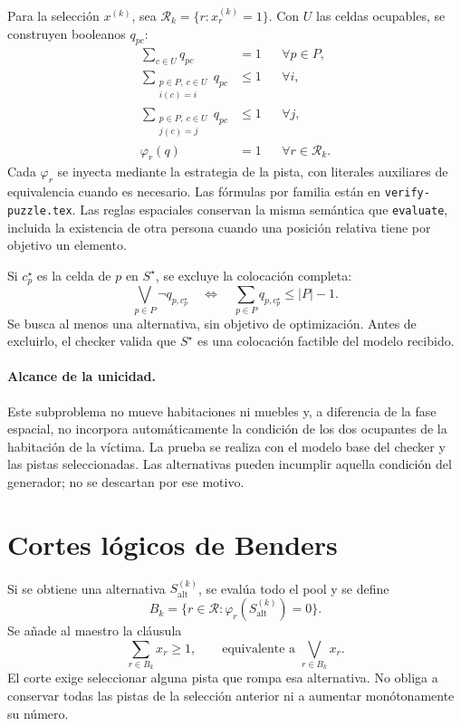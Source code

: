 \documentclass[11pt,a4paper]{article}
\begin{document}
Para la selecci\'on $x^{(k)}$, sea
$\mathcal R_k=\{r:x_r^{(k)}=1\}$.
Con $U$ las celdas ocupables, se construyen booleanos $q_{pc}$:
\begin{align}
 \sum_{c\in U}q_{pc}&=1 &&\forall p\in P,\\
 \sum_{\substack{p\in P,\ c\in U\\i(c)=i}}q_{pc}&\leq1
      &&\forall i,\\
 \sum_{\substack{p\in P,\ c\in U\\j(c)=j}}q_{pc}&\leq1
      &&\forall j,\\
 \varphi_r(q)&=1 &&\forall r\in\mathcal R_k.
\end{align}
Cada $\varphi_r$ se inyecta mediante la estrategia de la pista, con
literales auxiliares de equivalencia cuando es necesario.
Las f\'ormulas por familia est\'an en \texttt{verify-puzzle.tex}.
Las reglas espaciales conservan la misma sem\'antica que
\texttt{evaluate}, incluida la existencia de otra persona cuando
una posici\'on relativa tiene por objetivo un elemento.

Si $c_p^\star$ es la celda de $p$ en $S^\star$, se excluye la
colocaci\'on completa:
\[
 \bigvee_{p\in P}\neg q_{p,c_p^\star}
 \quad\Longleftrightarrow\quad
 \sum_{p\in P}q_{p,c_p^\star}\leq |P|-1.
\]
Se busca al menos una alternativa, sin objetivo de optimizaci\'on.
Antes de excluirlo, el checker valida que $S^\star$ es una
colocaci\'on factible del modelo recibido.

\paragraph{Alcance de la unicidad.}
Este subproblema no mueve habitaciones ni muebles y, a diferencia de
la fase espacial, no incorpora autom\'aticamente la condici\'on de
los dos ocupantes de la habitaci\'on de la v\'ictima. La prueba se
realiza con el modelo base del checker y las pistas seleccionadas.
Las alternativas pueden incumplir aquella condici\'on del generador;
no se descartan por ese motivo.

\section{Cortes l\'ogicos de Benders}

Si se obtiene una alternativa $S_{\mathrm{alt}}^{(k)}$, se eval\'ua
todo el pool y se define
\[
 B_k=\{r\in\mathcal R:\varphi_r(S_{\mathrm{alt}}^{(k)})=0\}.
\]
Se a\~nade al maestro la cl\'ausula
\[
 \boxed{\sum_{r\in B_k}x_r\geq1,}
 \qquad\text{equivalente a }\bigvee_{r\in B_k}x_r.
\]
El corte exige seleccionar alguna pista que rompa esa alternativa.
No obliga a conservar todas las pistas de la selecci\'on anterior
ni a aumentar mon\'otonamente su n\'umero.
\end{document}
